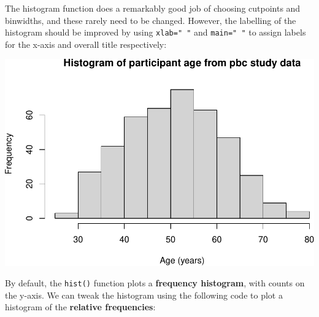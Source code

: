 \documentclass[
]{memoir}
\newenvironment{Shaded}{\begin{snugshade}}{\end{snugshade}}
\newcommand{\AttributeTok}[1]{\textcolor[rgb]{0.77,0.63,0.00}{#1}}
\newcommand{\ConstantTok}[1]{\textcolor[rgb]{0.00,0.00,0.00}{#1}}
\newcommand{\DecValTok}[1]{\textcolor[rgb]{0.00,0.00,0.81}{#1}}
\newcommand{\FunctionTok}[1]{\textcolor[rgb]{0.00,0.00,0.00}{#1}}
\newcommand{\NormalTok}[1]{#1}
\newcommand{\OtherTok}[1]{\textcolor[rgb]{0.56,0.35,0.01}{#1}}
\newcommand{\SpecialCharTok}[1]{\textcolor[rgb]{0.00,0.00,0.00}{#1}}
\newcommand{\StringTok}[1]{\textcolor[rgb]{0.31,0.60,0.02}{#1}}
\begin{document}
The histogram function does a remarkably good job of choosing cutpoints and binwidths, and these rarely need to be changed. However, the labelling of the histogram should be improved by using \texttt{xlab="\ "} and \texttt{main="\ "} to assign labels for the x-axis and overall title respectively:

\begin{Shaded}
\end{Shaded}

\includegraphics{phcm9795-R-notes_files/figure-latex/unnamed-chunk-33-1.pdf}

By default, the \texttt{hist()} function plots a \textbf{frequency histogram}, with counts on the y-axis. We can tweak the histogram using the following code to plot a histogram of the \textbf{relative frequencies}:

\begin{Shaded}
\end{Shaded}
\end{document}

